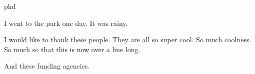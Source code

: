 \documentclass[times,12pt,titlepage]{mstthesis}
\begin{document}

\begin{ThesisTitlePage}{phd}


\author{\MakeUppercase{Edward T. Norris}}








\end{ThesisTitlePage}



\begin{ThesisAbstract}
I went to the park one day. It was rainy.
\end{ThesisAbstract}


\begin{ThesisAcknowledgment}
I would like to thank these people. They are all so super cool. So much coolness. So much so that this is now over a line long.

And these funding agencies.
\end{ThesisAcknowledgment}
\begin{ThesisFrontMatter}
\tableofcontents
\listoffigures
\listoftables
\listofsymbols
\end{ThesisFrontMatter}

\begin{ThesisBody}



\end{ThesisBody}
\end{document}
